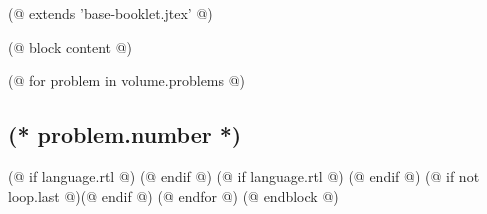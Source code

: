 (@ extends 'base-booklet.jtex' @)

(@ block content @)


    \pagestyle{online}

    (@ for problem in volume.problems @)%
        \setcounter{volume}{(* volume.number *)}%
        \setcounter{problem}{(* problem.number *)}%
        \subsection{\texorpdfstring{(* problem.number *)}{(* problem.number *). (* problem.id *)}}%
        \label{ssc:problem-(* problem.id*)}%
        (@ if language.rtl @) \arabicfont\setRL (@ endif @)
        (@ if language.rtl @) \unsetRL (@ endif @)
        (@ if not loop.last @)\newpage(@ endif @)
    (@ endfor @)
    \newpage
(@ endblock @)
